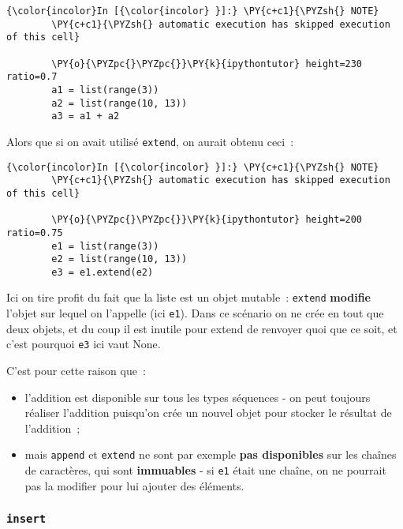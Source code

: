     \begin{Verbatim}[commandchars=\\\{\}]
{\color{incolor}In [{\color{incolor} }]:} \PY{c+c1}{\PYZsh{} NOTE}
        \PY{c+c1}{\PYZsh{} automatic execution has skipped execution of this cell}
        
        \PY{o}{\PYZpc{}\PYZpc{}}\PY{k}{ipythontutor} height=230 ratio=0.7
        a1 = list(range(3))
        a2 = list(range(10, 13))
        a3 = a1 + a2
\end{Verbatim}


    Alors que si on avait utilisé \texttt{extend}, on aurait obtenu ceci~:

    \begin{Verbatim}[commandchars=\\\{\}]
{\color{incolor}In [{\color{incolor} }]:} \PY{c+c1}{\PYZsh{} NOTE}
        \PY{c+c1}{\PYZsh{} automatic execution has skipped execution of this cell}
        
        \PY{o}{\PYZpc{}\PYZpc{}}\PY{k}{ipythontutor} height=200 ratio=0.75
        e1 = list(range(3))
        e2 = list(range(10, 13))
        e3 = e1.extend(e2)
\end{Verbatim}


    Ici on tire profit du fait que la liste est un objet mutable~:
\texttt{extend} \textbf{modifie} l'objet sur lequel on l'appelle (ici
\texttt{e1}). Dans ce scénario on ne crée en tout que deux objets, et du
coup il est inutile pour extend de renvoyer quoi que ce soit, et c'est
pourquoi \texttt{e3} ici vaut None.

    C'est pour cette raison que~:

\begin{itemize}
\tightlist
\item
  l'addition est disponible sur tous les types séquences - on peut
  toujours réaliser l'addition puisqu'on crée un nouvel objet pour
  stocker le résultat de l'addition~;
\item
  mais \texttt{append} et \texttt{extend} ne sont par exemple
  \textbf{pas disponibles} sur les chaînes de caractères, qui sont
  \textbf{immuables} - si \texttt{e1} était une chaîne, on ne pourrait
  pas la modifier pour lui ajouter des éléments.
\end{itemize}

    \hypertarget{insert}{%
\subsubsection{\texorpdfstring{\texttt{insert}}{insert}}\label{insert}}

